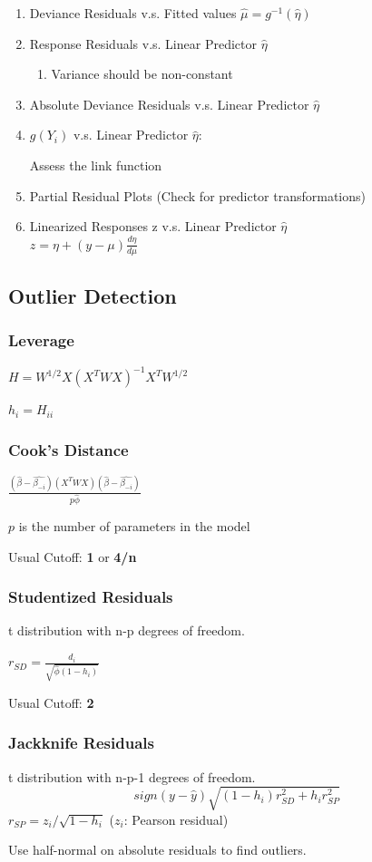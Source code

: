 \documentclass[10pt,landscape, fleqn]{article}
\begin{document}
\begin{multicols}{3}
\begin{enumerate}
\begin{enumerate}
						  \end{enumerate}
					\item Deviance Residuals v.s. Fitted values $\hat{\mu}=g^{-1}(\hat{\eta})$
					\item Response Residuals v.s. Linear Predictor $\hat{\eta}$ 
						  \begin{enumerate}
						  	 \item Variance should be non-constant
						  \end{enumerate}
					\item Absolute Deviance Residuals v.s. Linear Predictor $\hat{\eta}$
					\item $g(Y_i)$ v.s. Linear Predictor $\hat{\eta}$: \par 
							Assess the link function
					\item Partial Residual Plots (Check for predictor transformations)
					\item Linearized Responses z v.s. Linear Predictor $\hat{\eta}$\\
						$z = \eta + (y - \mu)\frac{d\eta}{d\mu}$
				\end{enumerate}
			\subsection{Outlier Detection}
				\subsubsection{Leverage}
					$ H = W^{1/2}X(X^TWX)^{-1}X^TW^{1/2}$ \par 
					$h_i = H_{ii}$
				\subsubsection{Cook's Distance}
					$ \frac{(\hat{\beta}-\hat{\beta_{-i}})(X^TWX)(\hat{\beta}-\hat{\beta_{-i}})}{p\hat{\phi}} $ \par 
					$p$ is the number of parameters in the model \par 
					Usual Cutoff: \textbf{1} or \textbf{4/n}
				\subsubsection{Studentized Residuals}
					t distribution with n-p degrees of freedom. \par 
					$r_{SD} = \frac{d_i}{\sqrt{\hat{\phi}(1-h_i)}}$ \par 
					Usual Cutoff: \textbf{2}
				\subsubsection{Jackknife Residuals}
					t distribution with n-p-1 degrees of freedom. 
					\[ sign(y-\hat{y})\sqrt{(1-h_i)r_{SD}^2+h_i r_{SP}^2} \]
					$r_{SP} = z_i/\sqrt{1-h_i}$ ($z_i$: Pearson residual) \par 
					Use half-normal on absolute residuals to find outliers.
				

\end{multicols}
\end{document}
